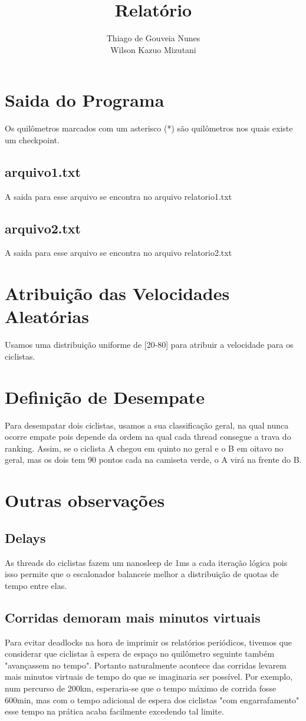 \documentclass[a4paper,11pt]{article}
\title{Relatório}
\author{Thiago de Gouveia Nunes \\ Wilson Kazuo Mizutani}
\begin{document}
\maketitle
\tableofcontents

\clearpage
\section{Saida do Programa}
  Os quilômetros marcados com um asterisco (*) são quilômetros nos quais existe um checkpoint.
\subsection{arquivo1.txt}
  A saida para esse arquivo se encontra no arquivo relatorio1.txt
\subsection{arquivo2.txt}
  A saida para esse arquivo se encontra no arquivo relatorio2.txt
\section{Atribuição das Velocidades Aleatórias}
  Usamos uma distribuição uniforme de [20-80] para atribuir a velocidade para os ciclistas.
\section{Definição de Desempate}
  Para desempatar dois ciclistas, usamos a sua classificação geral, na qual nunca ocorre empate pois depende da ordem na qual cada thread
consegue a trava do ranking. Assim, se o ciclista A chegou em quinto no geral e o B em oitavo no geral, mas os dois tem 90 pontos
cada na camiseta verde, o A virá na frente do B.
\section{Outras observações}
\subsection{Delays}
  As threads do ciclistas fazem um nanosleep de 1ms a cada iteração lógica pois isso permite que o escalonador balanceie melhor a
distribuição de quotas de tempo entre elas.
\subsection{Corridas demoram mais minutos virtuais}
  Para evitar deadlocks na hora de imprimir os relatórios periódicos, tivemos que considerar que ciclistas à espera de espaço no
quilômetro seguinte também "avançassem no tempo". Portanto naturalmente acontece das corridas levarem mais minutos virtuais de tempo do
que se imaginaria ser possível. Por exemplo, num percurso de 200km, esperaria-se que o tempo máximo de corrida fosse 600min, mas com o
tempo adicional de espera dos ciclistas "com engarrafamento" esse tempo na prática acaba facilmente excedendo tal limite.
\end{document}
